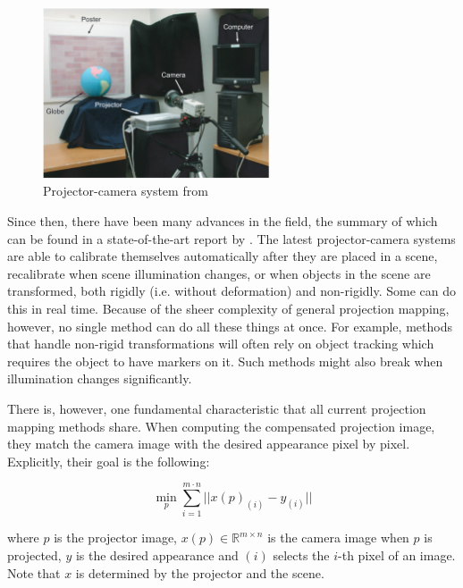\begin{figure}[ht]
    \centering
    \includegraphics[width=0.6\textwidth]{images/01-procam.png}
    \caption{Projector-camera system from \citet{Grossberg2004}}
    \label{fig:intro_procam}
\end{figure}

Since then, there have been many advances in the field, the summary of which can be found in a state-of-the-art report by \citet{Grundhofer2018}. The latest projector-camera systems are able to calibrate themselves automatically after they are placed in a scene, recalibrate when scene illumination changes, or when objects in the scene are transformed, both rigidly (i.e. without deformation) and non-rigidly. Some can do this in real time. Because of the sheer complexity of general projection mapping, however, no single method can do all these things at once. For example, methods that handle non-rigid transformations will often rely on object tracking which requires the object to have markers on it. Such methods might also break when illumination changes significantly.

There is, however, one fundamental characteristic that all current projection mapping methods share. When computing the compensated projection image, they match the camera image with the desired appearance pixel by pixel. Explicitly, their goal is the following:

\begin{equation}
    \label{eq:projection_mapping-per_pixel}
    \min_p \sum_{i=1}^{m \cdot n} || x(p)_{(i)} - y_{(i)} ||
\end{equation}

where \(p\) is the projector image, \(x(p) \in \mathbb{R}^{m \times n}\) is the camera image when \(p\) is projected, \(y\) is the desired appearance and \((i)\) selects the \(i\)-th pixel of an image. Note that \(x\) is determined by the projector and the scene.

